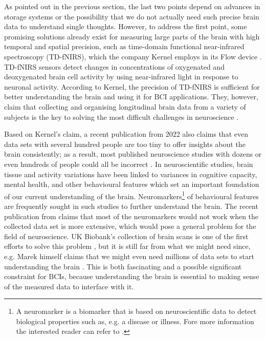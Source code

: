 As pointed out in the previous section, the last two points depend on advances in storage systems or the possibility that we do not actually need such precise brain data to understand single thoughts. However, to address the first point, some promising solutions already exist for measuring large parts of the brain with high temporal and spatial precision, such as time-domain functional near-infrared spectroscopy (TD-fNIRS), which the company Kernel employs in its Flow device \citep{ban_kernel_2021}. TD-fNIRS sensors detect changes in concentrations of oxygenated and deoxygenated brain cell activity by using near-infrared light in response to neuronal activity. According to Kernel, the precision of TD-fNIRS is sufficient for better understanding the brain and using it for BCI applications. They, however, claim that collecting and organising longitudinal brain data from a variety of subjects is the key to solving the most difficult challenges in neuroscience \citep{kernel_hello-humanitypdf_nodate}.

\newpage

Based on Kernel's claim, a recent publication from 2022 also claims that even data sets with several hundred people are too tiny to offer insights about the brain consistently; as a result, most published neuroscience studies with dozens or even hundreds of people could all be incorrect \citep{marek_reproducible_2022}. In neuroscientific studies, brain tissue and activity variations have been linked to variances in cognitive capacity, mental health, and other behavioural features which set an important foundation of our current understanding of the brain. Neuromarkers\footnote{A neuromarker is a biomarker that is based on neuroscientific data to detect biological properties such as, e.g. a disease or illness. Fore more information the interested reader can refer to \cite{jollans_neuromarkers_2018}.} of behavioural features are frequently sought in such studies to further understand the brain. The recent publication from \citeauthor{marek_reproducible_2022} claims that most of the neuromarkers would not work when the collected data set is more extensive, which would pose a general problem for the field of neuroscience. UK Biobank's collection of brain scans is one of the first efforts to solve this problem \citep{noauthor_imaging_nodate}, but it is still far from what we might need since, e.g. Marek himself claims that we might even need millions of data sets to start understanding the brain \citep{callaway_can_2022}. This is both fascinating and a possible significant constraint for BCIs, because understanding the brain is essential to making sense of the measured data to interface with it.

